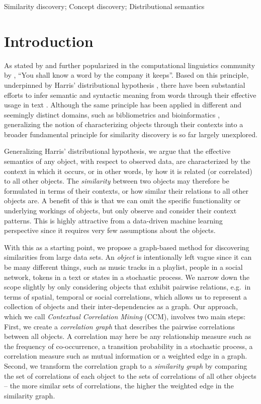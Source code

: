 \documentclass{kais}
\begin{document}
\begin{keywords}
Similarity discovery; Concept discovery; Distributional semantics
\end{keywords}

\section{Introduction}
\label{sec:introduction}

As stated by  and further popularized in the computational linguistics community by , 
``You shall know a word by the company it keeps''. Based on this principle, underpinned by Harris' distributional hypothesis \cite{Harris54}, 
there have been substantial efforts to infer semantic and syntactic meaning
 from words through their effective usage in text \cite{Harispe2015}. Although the same principle has been applied in 
 different and seemingly distinct domains, such as bibliometrics  \cite{Kessler1963} and bioinformatics 
 \cite{ravasz2002hierarchical}, generalizing the notion of characterizing objects through 
their contexts into a broader fundamental principle for similarity discovery is so far largely unexplored.

Generalizing Harris' distributional hypothesis, we argue that the effective semantics of any object, with respect to observed data, are characterized 
by the context in which it occurs, or in other words, by how it is related (or correlated) to all other objects. The \emph{similarity} 
between two objects may therefore be formulated in terms of their contexts, or how similar their relations to all other
objects are.
A benefit of this is that we can omit the specific functionality or underlying workings of objects, but
only observe and consider their context patterns. This is highly attractive from a data-driven machine learning
perspective since it requires very few assumptions about the objects.

With this as a starting point, we propose a graph-based method for discovering similarities from large data
sets. An \emph{object} is intentionally left vague since it can be many different things, such as
music tracks in a playlist, people in a social network, tokens in a text or states in a stochastic process. We narrow down the scope
slightly by only considering objects that exhibit pairwise relations, e.g.\ in terms of spatial, temporal or social
correlations, which allows us to represent a collection of objects and their inter-dependencies as a graph. Our
approach, which we call \emph{Contextual Correlation Mining} (CCM), involves two main steps: First, we create a \emph{correlation graph} 
that describes the pairwise correlations between all objects. A correlation may here be any relationship measure such as the frequency 
of co-occurrence, a transition probability in a stochastic process, a correlation measure such as mutual information or a weighted edge in a graph. 
Second, we transform the correlation graph to a \emph{similarity graph} by comparing the set of correlations of each object
to the sets of correlations of all other objects -- the more similar sets of correlations, the higher the weighted edge in the
similarity graph.
\end{document}
